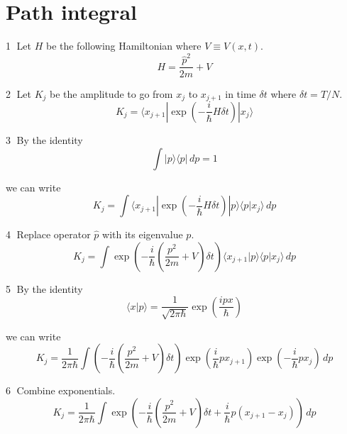 \documentclass[12pt]{article}
\begin{document}
\section*{Path integral}
\textcircled{\scriptsize1}
Let $H$ be the following Hamiltonian where $V\equiv V(x,t)$.
\begin{equation*}
H=\frac{\hat p^2}{2m}+V
\end{equation*}

\textcircled{\scriptsize2}
Let $K_j$ be the amplitude to go from $x_j$ to $x_{j+1}$
in time $\delta t$ where $\delta t=T/N$.
\begin{equation*}
K_j=\langle x_{j+1}|\exp\left(-\frac{i}{\hbar}H\delta t\right)|x_j\rangle
\end{equation*}

\textcircled{\scriptsize3}
By the identity
\begin{equation*}
\int|p\rangle\langle p|\,dp=1
\end{equation*}

we can write
\begin{equation*}
K_j=\int\langle x_{j+1}|\exp\left(-\frac{i}{\hbar}H\delta t\right)
|p\rangle\langle p|x_j\rangle\,dp
\end{equation*}

\textcircled{\scriptsize4}
Replace operator $\hat p$ with its eigenvalue $p$.
\begin{equation*}
K_j=\int
\exp\left(-\frac{i}{\hbar}\left(\frac{p^2}{2m}+V\right)\delta t\right)
\langle x_{j+1}|p\rangle\langle p|x_j\rangle\,dp
\end{equation*}

\textcircled{\scriptsize5}
By the identity
\begin{equation*}
\langle x|p\rangle=\frac{1}{\sqrt{2\pi\hbar}}\exp\left(\frac{ipx}{\hbar}\right)
\end{equation*}

we can write
\begin{equation*}
K_j=\frac{1}{2\pi\hbar}
\int
\left(-\frac{i}{\hbar}\left(\frac{p^2}{2m}+V\right)\delta t\right)
\exp\left(\frac{i}{\hbar}px_{j+1}\right)
\exp\left(-\frac{i}{\hbar}px_j\right)
\,dp
\end{equation*}

\textcircled{\scriptsize6}
Combine exponentials.
\begin{equation*}
K_j=\frac{1}{2\pi\hbar}
\int
\exp\left(-\frac{i}{\hbar}
\left(\frac{p^2}{2m}+V\right)
\delta t
+\frac{i}{\hbar}p(x_{j+1}-x_j)\right)
\,dp
\end{equation*}
\end{document}
